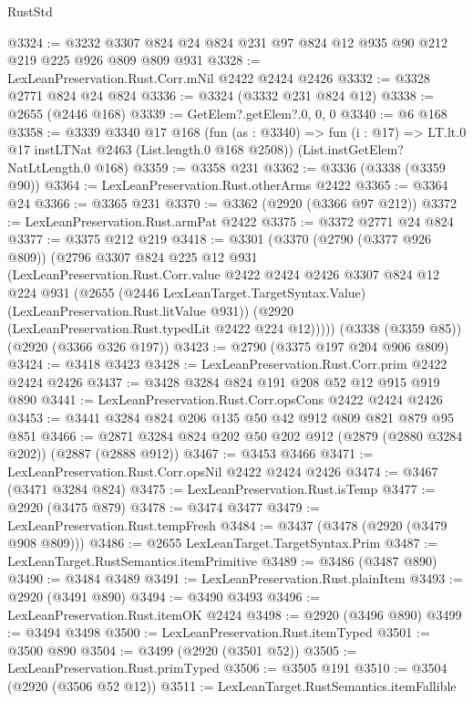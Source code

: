 \begin{lexlean}{RustStd}
\begin{coremodule}
@3324 := @3232 @3307 @824 @24 @824 @231 @97 @824 @12 @935 @90 @212 @219 @225 @926 @809 @809 @931
@3328 := LexLeanPreservation.Rust.Corr.mNil @2422 @2424 @2426
@3332 := @3328 @2771 @824 @24 @824
@3336 := @3324 (@3332 @231 @824 @12)
@3338 := @2655 (@2446 @168)
@3339 := GetElem?.getElem?.{0, 0, 0}
@3340 := @6 @168
@3358 := @3339
    @3340
    @17
    @168
    (fun (as : @3340) =>
    fun (i : @17) => LT.lt.{0} @17 instLTNat @2463 (List.length.{0} @168 @2508))
    (List.instGetElem?NatLtLength.{0} @168)
@3359 := @3358 @231
@3362 := @3336 (@3338 (@3359 @90))
@3364 := LexLeanPreservation.Rust.otherArms @2422
@3365 := @3364 @24
@3366 := @3365 @231
@3370 := @3362 (@2920 (@3366 @97 @212))
@3372 := LexLeanPreservation.Rust.armPat @2422
@3375 := @3372 @2771 @24 @824
@3377 := @3375 @212 @219
@3418 := @3301
    (@3370
      (@2790 (@3377 @926 @809))
      (@2796
        @3307
        @824
        @225
        @12
        @931
        (LexLeanPreservation.Rust.Corr.value
          @2422
          @2424
          @2426
          @3307
          @824
          @12
          @224
          @931
          (@2655 (@2446 LexLeanTarget.TargetSyntax.Value) (LexLeanPreservation.Rust.litValue @931))
          (@2920 (LexLeanPreservation.Rust.typedLit @2422 @224 @12)))))
    (@3338 (@3359 @85))
    (@2920 (@3366 @326 @197))
@3423 := @2790 (@3375 @197 @204 @906 @809)
@3424 := @3418 @3423
@3428 := LexLeanPreservation.Rust.Corr.prim @2422 @2424 @2426
@3437 := @3428 @3284 @824 @191 @208 @52 @12 @915 @919 @890
@3441 := LexLeanPreservation.Rust.Corr.opsCons @2422 @2424 @2426
@3453 := @3441 @3284 @824 @206 @135 @50 @42 @912 @809 @821 @879 @95 @851
@3466 := @2871 @3284 @824 @202 @50 @202 @912 (@2879 (@2880 @3284 @202)) (@2887 (@2888 @912))
@3467 := @3453 @3466
@3471 := LexLeanPreservation.Rust.Corr.opsNil @2422 @2424 @2426
@3474 := @3467 (@3471 @3284 @824)
@3475 := LexLeanPreservation.Rust.isTemp
@3477 := @2920 (@3475 @879)
@3478 := @3474 @3477
@3479 := LexLeanPreservation.Rust.tempFresh
@3484 := @3437 (@3478 (@2920 (@3479 @908 @809)))
@3486 := @2655 LexLeanTarget.TargetSyntax.Prim
@3487 := LexLeanTarget.RustSemantics.itemPrimitive
@3489 := @3486 (@3487 @890)
@3490 := @3484 @3489
@3491 := LexLeanPreservation.Rust.plainItem
@3493 := @2920 (@3491 @890)
@3494 := @3490 @3493
@3496 := LexLeanPreservation.Rust.itemOK @2424
@3498 := @2920 (@3496 @890)
@3499 := @3494 @3498
@3500 := LexLeanPreservation.Rust.itemTyped
@3501 := @3500 @890
@3504 := @3499 (@2920 (@3501 @52))
@3505 := LexLeanPreservation.Rust.primTyped
@3506 := @3505 @191
@3510 := @3504 (@2920 (@3506 @52 @12))
@3511 := LexLeanTarget.RustSemantics.itemFallible

\end{coremodule}
\end{lexlean}
